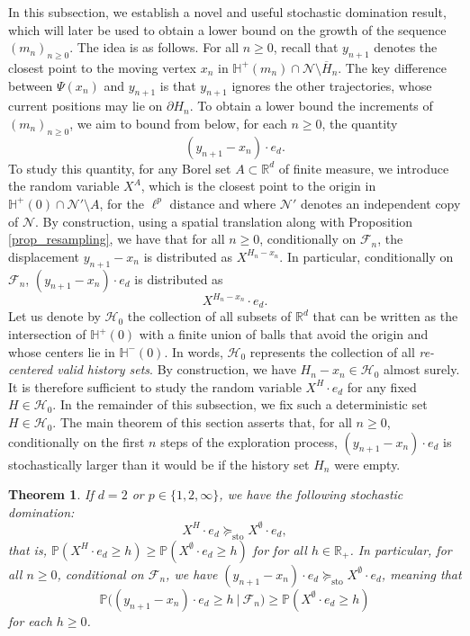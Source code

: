 \documentclass[a4paper, 11pt]{article}
\theoremstyle{plain}
\newtheorem{Theorem}{Theorem}[section]
\theoremstyle{definition}
\newcommand{\R}{\mathbb{R}}
\renewcommand{\P}{\mathbb{P}}
\numberwithin{equation}{section}
\begin{document}
In this subsection, we establish a novel and useful stochastic domination result, which will later be used to obtain a lower bound on the growth of the sequence $(m_n)_{n\geq 0}$. The idea is as follows. For all $n\geq 0$, recall that $y_{n+1}$ denotes the closest point to the moving vertex $x_n$ in $\mathbb H^+(m_n)\cap\mathcal N\setminus\overline H_n$. The key difference between $\Psi(x_n)$ and $y_{n+1}$ is that $y_{n+1}$ ignores the other trajectories, whose current positions may lie on $\partial H_n$. To obtain a lower bound the increments of $(m_n)_{n\geq 0}$, we aim to bound from below, for each $n\geq0$, the quantity
    \[(y_{n+1}-x_n)\cdot e_d.\]
To study this quantity, for any Borel set $A\subset\R^d$ of finite measure, we introduce the random variable $X^A$, which is the closest point to the origin in $\mathbb H^+(0)\cap\mathcal N'\setminus A$, for the $\ell^p$ distance and where $\mathcal N'$ denotes an independent copy of $\mathcal N$. By construction, using a spatial translation along with Proposition \ref{prop_resampling}, we have that for all $n\geq 0$, conditionally on $\mathcal F_n$, the displacement $y_{n+1}-x_n$ is distributed as $X^{H_n-x_n}$. In particular, conditionally on $\mathcal F_n$, $(y_{n+1}-x_n)\cdot e_d$ is distributed as 
    \[X^{H_n-x_n}\cdot e_d.\]
Let us denote by $\mathcal H_0$ the collection of all subsets of $\R^d$ that can be written as the intersection of $\mathbb H^+(0)$ with a finite union of balls that avoid the origin and whose centers lie in $\mathbb H^-(0)$. In words, $\mathcal H_0$ represents the collection of all \emph{re-centered valid history sets}. By construction, we have $H_n-x_n\in\mathcal H_0$ almost surely. It is therefore sufficient to study the random variable $X^H\cdot e_d$ for any fixed $H\in\mathcal H_0$. In the remainder of this subsection, we fix such a deterministic set $H\in\mathcal H_0$. The main theorem of this section asserts that, for all $n\geq 0$, conditionally on the first $n$ steps of the exploration process, $(y_{n+1}-x_n)\cdot e_d$ is stochastically larger than it would be if the history set $H_n$ were empty.


\begin{Theorem}
    \label{thm_sto_dom_poisson}
    If $d=2$ or $p\in\{1, 2, \infty\}$, we have the following stochastic domination:
        \[X^H\cdot e_d\succeq_{\mathrm{sto}}X^\emptyset\cdot e_d,\]
    that is, $\P(X^H\cdot e_d\geq h)\geq\P(X^\emptyset\cdot e_d\geq h)$ for for all $h\in\R_+$. In particular, for all $n\geq 0$, conditional on $\mathcal F_n$, we have $(y_{n+1}-x_n)\cdot e_d\succeq_{\mathrm{sto}}X^\emptyset\cdot e_d$, meaning that
        \[\P\big((y_{n+1}-x_n)\cdot e_d\geq h~\big|~\mathcal F_n\big)\geq\P(X^\emptyset\cdot e_d\geq h)\]
    for each $h\geq 0$.
\end{Theorem}
\end{document}
